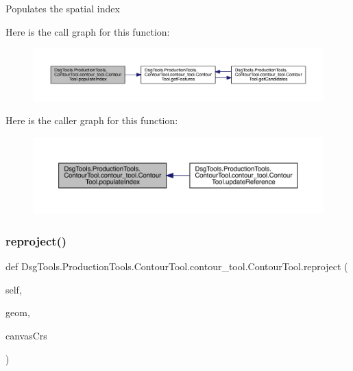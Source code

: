\begin{DoxyVerb}Populates the spatial index
\end{DoxyVerb}
 Here is the call graph for this function\+:
\nopagebreak
\begin{figure}[H]
\begin{center}
\leavevmode
\includegraphics[width=350pt]{class_dsg_tools_1_1_production_tools_1_1_contour_tool_1_1contour__tool_1_1_contour_tool_ad0b252f6fd56abb4d75c522e7124bab7_cgraph}
\end{center}
\end{figure}
Here is the caller graph for this function\+:
\nopagebreak
\begin{figure}[H]
\begin{center}
\leavevmode
\includegraphics[width=350pt]{class_dsg_tools_1_1_production_tools_1_1_contour_tool_1_1contour__tool_1_1_contour_tool_ad0b252f6fd56abb4d75c522e7124bab7_icgraph}
\end{center}
\end{figure}
\mbox{\label{class_dsg_tools_1_1_production_tools_1_1_contour_tool_1_1contour__tool_1_1_contour_tool_ad4eeaf446ce7ef596213c8731de8ea68}} 
\subsubsection{\texorpdfstring{reproject()}{reproject()}}
{\footnotesize\ttfamily def Dsg\+Tools.\+Production\+Tools.\+Contour\+Tool.\+contour\+\_\+tool.\+Contour\+Tool.\+reproject (\begin{DoxyParamCaption}\item[{}]{self,  }\item[{}]{geom,  }\item[{}]{canvas\+Crs }\end{DoxyParamCaption})}

